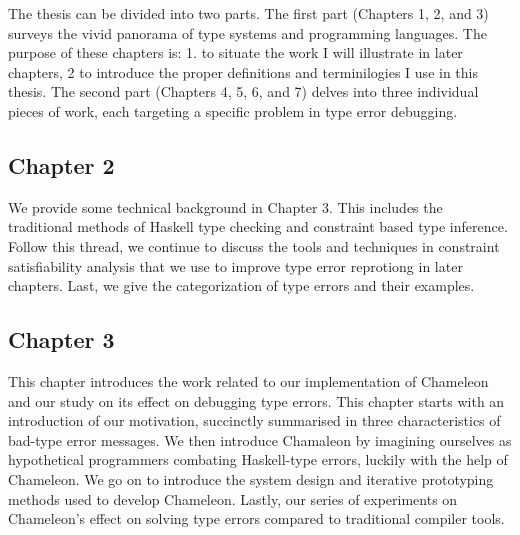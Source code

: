 The thesis can be divided into two parts. The first part (Chapters 1, 2, and 3) surveys the vivid panorama of type systems and programming languages. The purpose of these chapters is: 1. to situate the work I will illustrate in later chapters, 2 to introduce the proper definitions and terminilogies I use in this thesis.  The second part (Chapters 4, 5, 6, and 7) delves into three individual pieces of work, each targeting a specific problem in type error debugging.





\subsection{Chapter 2}
We provide some technical background in Chapter 3. This includes the traditional methods of Haskell type checking and constraint based type inference. Follow this thread, we continue to discuss the tools and techniques in constraint satisfiability analysis that we use to improve type error reprotiong in later chapters. Last, we give the categorization of type errors and their examples. 

\subsection{Chapter 3}
This chapter introduces the work related to our implementation of Chameleon and our study on its effect on debugging type errors. This chapter starts with an introduction of our motivation, succinctly summarised in three characteristics of bad-type error messages. We then introduce Chamaleon by imagining ourselves as hypothetical programmers combating Haskell-type errors, luckily with the help of Chameleon. We go on to introduce the system design and iterative prototyping methods used to develop Chameleon. Lastly, our series of experiments on Chameleon's effect on solving type errors compared to traditional compiler tools. 


